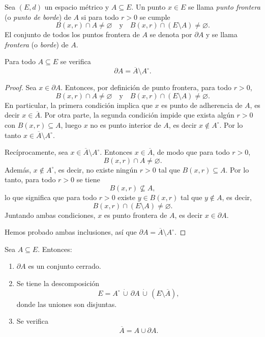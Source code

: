 \begin{defi}
Sea $(E,d)$ un espacio métrico y $A \subseteq E$.
Un punto $x \in E$ se llama \emph{punto frontera} (o \emph{punto de borde})
de $A$ si para todo $r>0$ se cumple
\[
B(x,r) \cap A \neq \varnothing
\quad\text{y}\quad
B(x,r) \cap (E \setminus A) \neq \varnothing.
\]
El conjunto de todos los puntos frontera de $A$ se denota por $\partial A$
y se llama \emph{frontera} (o \emph{borde}) de $A$.
\end{defi}

\begin{prop}
Para todo $A \subseteq E$ se verifica
\[
\partial A = \overline{A} \setminus A^\circ.
\]
\end{prop}

\begin{proof}
Sea $x \in \partial A$. Entonces, por definición de punto frontera,
para todo $r>0$,
\[
B(x,r) \cap A \neq \varnothing
\quad\text{y}\quad
B(x,r) \cap (E \setminus A) \neq \varnothing.
\]
En particular, la primera condición implica que $x$ es punto de adherencia
de $A$, es decir $x \in \overline{A}$. Por otra parte, la segunda condición
impide que exista algún $r>0$ con $B(x,r) \subseteq A$, luego $x$ no es
punto interior de $A$, es decir $x \notin A^\circ$. Por lo tanto
$x \in \overline{A} \setminus A^\circ$.

Recíprocamente, sea $x \in \overline{A} \setminus A^\circ$. Entonces
$x \in \overline{A}$, de modo que para todo $r>0$,
\[
B(x,r) \cap A \neq \varnothing.
\]
Además, $x \notin A^\circ$, es decir, no existe ningún $r>0$ tal que
$B(x,r) \subseteq A$. Por lo tanto, para todo $r>0$ se tiene
\[
B(x,r) \not\subseteq A,
\]
lo que significa que para todo $r>0$ existe $y \in B(x,r)$ tal que
$y \notin A$, es decir,
\[
B(x,r) \cap (E \setminus A) \neq \varnothing.
\]
Juntando ambas condiciones, $x$ es punto frontera de $A$, es decir
$x \in \partial A$.

Hemos probado ambas inclusiones, así que $\partial A = \overline{A} \setminus A^\circ$.
\end{proof}

\begin{prop}
Sea $A \subseteq E$. Entonces:
\begin{enumerate}[label=(\roman*)]
    \item $\partial A$ es un conjunto cerrado.
    \item Se tiene la descomposición
    \[
    E = A^\circ \,\dot\cup\, \partial A \,\dot\cup\, (E \setminus \overline{A}),
    \]
    donde las uniones son disjuntas.
    \item Se verifica
    \[
    \overline{A} = A \cup \partial A.
    \]
\end{enumerate}
\end{prop}


